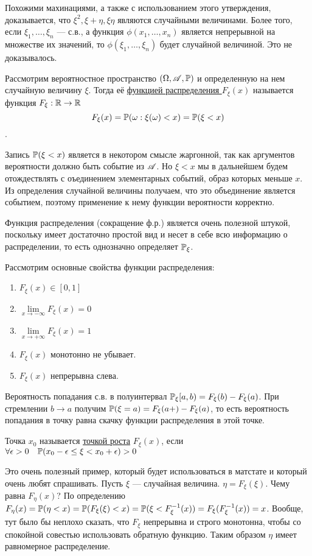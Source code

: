 \documentclass[../TV&MS.tex]{subfiles}
\begin{document}
Похожими махинациями, а также с использованием этого утверждения, доказывается, что $\xi^2, \xi + \eta, \xi\eta$ являются случайными величинами.
Более того, если $\xi_1, \ldots, \xi_n$ --- с.в., а функция $\phi(x_1, \ldots, x_n)$ является непрерывной на множестве их значений, то $\phi(\xi_1, \ldots, \xi_n)$ будет случайной 
величиной. Это не доказывалось.

\begin{Def}
Рассмотрим вероятностное пространство $(\Omega, \mathscr{A}, \mathbb{P})$ и определенную на нем случайную величину $\xi$. Тогда её \underline{функцией распределения $F_\xi(x)$}
 называется функция $F_\xi : \mathbb{R} \to \mathbb{R}$
$$F_\xi(x) = \mathbb{P}(\omega : \xi(\omega) < x) = \mathbb{P}(\xi < x)$$.
\end{Def}

Запись $\mathbb{P}(\xi < x)$ является в некотором смысле жаргонной, так как аргументов вероятности должно быть событие из $\mathscr{A}$. Но $\xi < x$ мы в дальнейшем будем 
отождествлять с оъединением элементарных событий, образ которых меньше $x$. Из определения случайной величины получаем, что это объединение является событием,
поэтому применение к нему функции вероятности корректно.

Функция распределения (сокращение ф.р.) является очень полезной штукой, поскольку имеет достаточно простой вид и несет в себе всю информацию о распределении, то есть однозначно 
определяет $\mathbb{P}_\xi$.

Рассмотрим основные свойства функции распределения:
\begin{enumerate}
	\item $F_\xi(x) \in [0, 1]$
	\item $\lim\limits_{x \to -\infty} F_\xi(x) = 0$
	\item $\lim\limits_{x \to +\infty} F_\xi(x) = 1$
	\item $F_\xi(x)$ монотонно не убывает.
	\item $F_\xi(x)$ непрерывна слева.
\end{enumerate}

Вероятность попадания с.в. в полуинтервал $\mathbb{P}_\xi[a,b) = F_\xi(b) - F_\xi(a)$. При стремлении $b \to a$ получим $\mathbb{P}(\xi = a) = F_\xi(a+) - F_\xi(a)$, то есть 
вероятность попадания в точку равна скачку функции распределения в этой точке.

\begin{Def}
Точка $x_0$ называется \underline{точкой роста} $F_\xi(x)$, если $\forall \epsilon > 0 \quad \mathbb{P}(x_0 - \epsilon \le \xi < x_0 + \epsilon) > 0$
\end{Def}
\begin{Ex}
Это очень полезный пример, который будет использоваться в матстате и который очень любят спрашивать. Пусть $\xi$ --- случайная величина. $\eta = F_\xi(\xi)$. Чему равна
$F_\eta(x)$? По определению $F_\eta(x) = \mathbb{P}(\eta < x) = \mathbb{P}(F_\xi(\xi) < x)=\mathbb{P}(\xi < F_\xi^{-1}(x)) = F_\xi(F_\xi^{-1}(x))=x$. Вообще, тут было бы неплохо 
сказать, что $F_\xi$ непрерывна и строго монотонна, чтобы со спокойной совестью использовать обратную функцию. Таким образом $\eta$ имеет равномерное распределение.
\end{Ex}

\newpage
\end{document}
